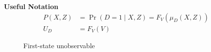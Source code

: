\begin{frame}
	\textbf{Useful Notation}
	\begin{align*}
		P(X, Z) & = \Pr(D = 1\mid X, Z) = F_V(\mu_D(X, Z)) \\
		U_D     & = F_V(V)
	\end{align*}
\end{frame}
\begin{frame}
	\begin{figure}\caption{First-state unobservable}
	\end{figure}
\end{frame}

